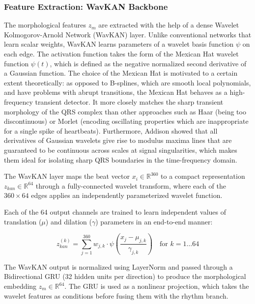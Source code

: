 \documentclass[final,5p,times,twocolumn,number]{elsarticle}
\begin{document}
\subsubsection{Feature Extraction: WavKAN Backbone}
The morphological features $z_m$ are extracted with the help of a dense Wavelet Kolmogorov-Arnold Network (WavKAN) layer. Unlike conventional networks that learn scalar weights, WavKAN learns parameters of a wavelet basis function $\psi$ on each edge. The activation function takes the form of the Mexican Hat wavelet function $\psi(t)$, which is defined as the negative normalized second derivative of a Gaussian function. The choice of the Mexican Hat is motivated to a certain extent theoretically: as opposed to B-splines, which are smooth local polynomials, and have problems with abrupt transitions, the Mexican Hat behaves as a high-frequency transient detector. It more closely matches the sharp transient morphology of the QRS complex than other approaches such as Haar (being too discontinuous) or Morlet (encoding oscillating properties which are inappropriate for a single spike of heartbeats). Furthermore, Addison \cite{addison_wavelet_2005} showed that all derivatives of Gaussian wavelets give rise to modulus maxima lines that are guaranteed to be continuous across scales at signal singularities, which makes them ideal for isolating sharp QRS boundaries in the time-frequency domain.

The WavKAN layer maps the beat vector $x_i \in \mathbb{R}^{360}$ to a compact representation $z_{kan} \in \mathbb{R}^{64}$ through a fully-connected wavelet transform, where each of the $360 \times 64$ edges applies an independently parameterized wavelet function.

Each of the 64 output channels are trained to learn independent values of translation ($\mu$) and dilation ($\gamma$) parameters in an end-to-end manner:

\begin{equation}
z_{kan}^{(k)} = \sum_{j=1}^{360} w_{j,k} \cdot \psi\left(\frac{x_j - \mu_{j,k}}{\gamma_{j,k}}\right) \quad \text{for } k=1 \dots 64
\end{equation}

The WavKAN output is normalized using LayerNorm and passed through a Bidirectional GRU (32 hidden units per direction) \cite{zhao_mak-net_2025, mousavi_inter-_2019} to produce the morphological embedding $z_m \in \mathbb{R}^{64}$. The GRU is used as a nonlinear projection, which takes the wavelet features as conditions before fusing them with the rhythm branch.
\end{document}
